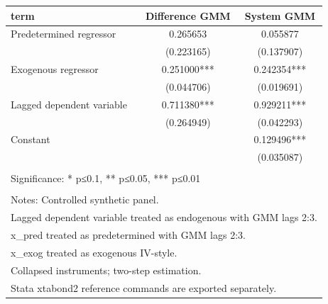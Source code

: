 \begin{tabular}{lcc}
\toprule
term & Difference GMM & System GMM \\
\midrule
Predetermined regressor & 0.265653 & 0.055877 \\
 & (0.223165) & (0.137907) \\
Exogenous regressor & 0.251000*** & 0.242354*** \\
 & (0.044706) & (0.019691) \\
Lagged dependent variable & 0.711380*** & 0.929211*** \\
 & (0.264949) & (0.042293) \\
Constant &  & 0.129496*** \\
 &  & (0.035087) \\
 &  &  \\
\multicolumn{3}{l}{Significance: * p≤0.1, ** p≤0.05, *** p≤0.01} \\
 &  &  \\
\multicolumn{3}{l}{Notes: Controlled synthetic panel.} \\
\multicolumn{3}{l}{Lagged dependent variable treated as endogenous with GMM lags 2:3.} \\
\multicolumn{3}{l}{x\_pred treated as predetermined with GMM lags 2:3.} \\
\multicolumn{3}{l}{x\_exog treated as exogenous IV-style.} \\
\multicolumn{3}{l}{Collapsed instruments; two-step estimation.} \\
\multicolumn{3}{l}{Stata xtabond2 reference commands are exported separately.} \\
\bottomrule
\end{tabular}